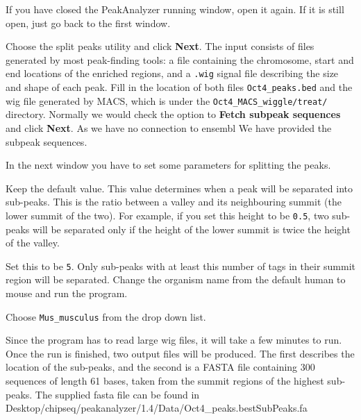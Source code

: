 \begin{steps}
If you have closed the PeakAnalyzer running window, open it again. If it is
still open, just go back to the first window.

Choose the split peaks utility and click \textbf{Next}. The input consists of
files generated by most peak-finding tools: a file containing the chromosome,
start and end locations of the enriched regions, and a \texttt{.wig} signal file
describing the size and shape of each peak. Fill in the location of both files
\texttt{Oct4\_peaks.bed} and the wig file generated by MACS, which is under the
\texttt{Oct4\_MACS\_wiggle/treat/} directory. Normally we would check the option to \textbf{Fetch subpeak
sequences} and click \textbf{Next}. As we have no connection to ensembl We have provided the subpeak sequences.

In the next window you have to set some parameters for splitting the peaks.

\begin{description}[style=multiline,labelindent=0cm,align=right,leftmargin=\descriptionlabelspace,rightmargin=1.5cm,font=\ttfamily]
 \item[Separation float] Keep the default value. This value determines when a
 peak will be separated into sub-peaks. This is the ratio between a valley and
 its neighbouring summit (the lower summit of the two). For example, if you set
 this height to be \texttt{0.5}, two sub-peaks will be separated only if the
 height of the lower summit is twice the height of the valley.
 \item[Minimum height] Set this to be \texttt{5}. Only sub-peaks with at least this
 number of tags in their summit region will be separated. Change the organism
 name from the default human to mouse and run the program.
 \item[Organism] Choose \texttt{Mus\_musculus} from the drop down list.
\end{description}
\end{steps}

\begin{information}
Since the program has to read large wig files, it will take a few minutes to
run. Once the run is finished, two output files will be produced. The first
describes the location of the sub-peaks, and the second is a FASTA file
containing 300 sequences of length 61 bases, taken from the summit regions of
the highest sub-peaks. The supplied fasta file can be found in Desktop/chipseq/peakanalyzer/1.4/Data/Oct4\_peaks.bestSubPeaks.fa
\end{information}

